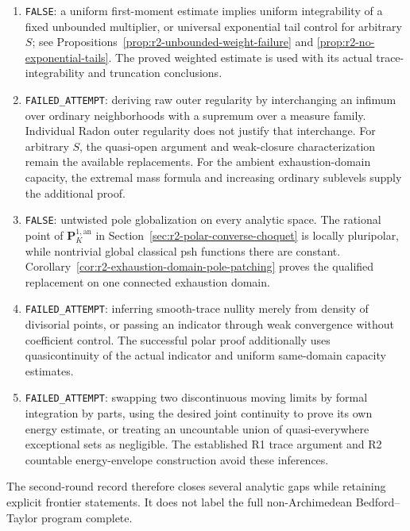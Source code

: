 \documentclass[11pt,a4paper]{article}
\numberwithin{equation}{section}
\theoremstyle{definition}
\theoremstyle{remark}
\newcommand{\an}{\mathrm{an}}
\begin{document}
\begin{enumerate}
\item \texttt{FALSE}: a uniform first-moment estimate implies uniform
integrability of a fixed unbounded multiplier, or universal exponential
tail control for arbitrary $S$; see
Propositions~\ref{prop:r2-unbounded-weight-failure} and
\ref{prop:r2-no-exponential-tails}. The proved weighted estimate is
used with its actual trace-integrability and truncation conclusions.

\item \texttt{FAILED\_ATTEMPT}: deriving raw outer regularity by
interchanging an infimum over ordinary neighborhoods with a supremum
over a measure family. Individual Radon outer regularity does not
justify that interchange. For arbitrary $S$, the quasi-open argument
and weak-closure characterization remain the available replacements.
For the ambient exhaustion-domain capacity, the extremal mass formula
and increasing ordinary sublevels supply the additional proof.

\item \texttt{FALSE}: untwisted pole globalization on every analytic
space. The rational point of $\mathbf P^{1,\an}_K$ in
Section~\ref{sec:r2-polar-converse-choquet} is locally pluripolar,
while nontrivial global classical psh functions there are constant.
Corollary~\ref{cor:r2-exhaustion-domain-pole-patching} proves the
qualified replacement on one connected exhaustion domain.

\item \texttt{FAILED\_ATTEMPT}: inferring smooth-trace nullity merely
from density of divisorial points, or passing an indicator through
weak convergence without coefficient control. The successful polar
proof additionally uses quasicontinuity of the actual indicator and
uniform same-domain capacity estimates.

\item \texttt{FAILED\_ATTEMPT}: swapping two discontinuous moving
limits by formal integration by parts, using the desired joint
continuity to prove its own energy estimate, or treating an
uncountable union of quasi-everywhere exceptional sets as negligible.
The established R1 trace argument and R2 countable energy-envelope
construction avoid these inferences.
\end{enumerate}

The second-round record therefore closes several analytic gaps while
retaining explicit frontier statements. It does not label the full
non-Archimedean Bedford--Taylor program complete.

\end{document}

